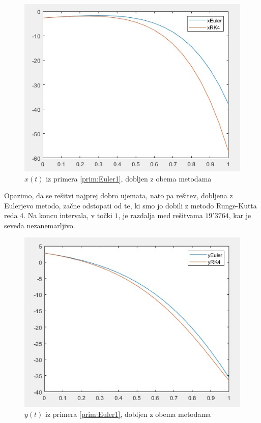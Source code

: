 \documentclass[a4paper, 10pt]{article}
\begin{document}
		\begin{figure}[H]
			\centering
			\includegraphics[scale=0.75]{Prim1x.jpg}
			\caption{$x(t)$ iz primera \ref{prim:Euler1}, dobljen z obema metodama}
		\end{figure}
		
		Opazimo, da se rešitvi najprej dobro ujemata, nato pa rešitev, dobljena z Eulerjevo metodo, začne odstopati od te, ki smo jo dobili z metodo Runge-Kutta reda $4$. Na koncu intervala, v točki $1$, je razdalja med rešitvama $19'3764$, kar je seveda nezanemarljivo.
		
		\begin{figure}[H]
			\centering
			\includegraphics[scale=0.75]{Prim1y.jpg}
			\caption{$y(t)$ iz primera \ref{prim:Euler1}, dobljen z obema metodama}
		\end{figure}
		
\end{document}
